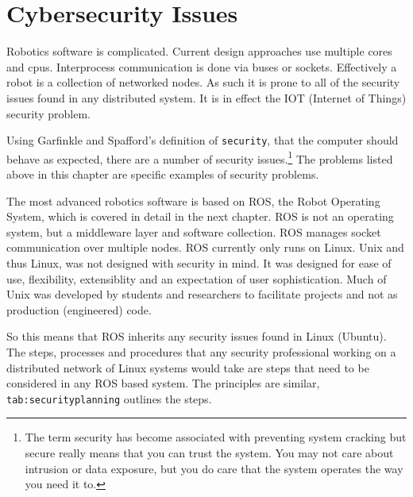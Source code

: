 \hypertarget{cybersecurity-issues}{%
\section{Cybersecurity Issues}\label{cybersecurity-issues}}

Robotics software is complicated. Current design approaches use multiple
cores and cpus. Interprocess communication is done via buses or sockets.
Effectively a robot is a collection of networked nodes. As such it is
prone to all of the security issues found in any distributed system. It
is in effect the IOT (Internet of Things) security problem.

Using Garfinkle and Spafford's definition of \texttt{security}, that the
computer should behave as expected, there are a number of security
issues.\footnote{The term security has become associated with preventing
  system cracking but secure really means that you can trust the system.
  You may not care about intrusion or data exposure, but you do care
  that the system operates the way you need it to.} The problems listed
above in this chapter are specific examples of security problems.

The most advanced robotics software is based on ROS, the Robot Operating
System, which is covered in detail in the next chapter. ROS is not an
operating system, but a middleware layer and software collection. ROS
manages socket communication over multiple nodes. ROS currently only
runs on Linux. Unix and thus Linux, was not designed with security in
mind. It was designed for ease of use, flexibility, extensiblity and an
expectation of user sophistication. Much of Unix was developed by
students and researchers to facilitate projects and not as production
(engineered) code.

So this means that ROS inherits any security issues found in Linux
(Ubuntu). The steps, processes and procedures that any security
professional working on a distributed network of Linux systems would
take are steps that need to be considered in any ROS based system. The
principles are similar, \texttt{tab:securityplanning} outlines the
steps.

